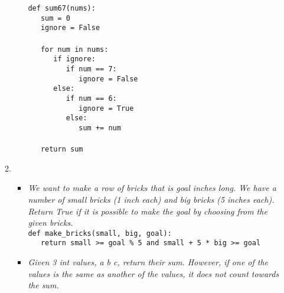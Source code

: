 \documentclass[9pt]{article}
\begin{document}
\begin{enumerate}
\begin{enumerate}
\begin{itemize}
                        \verb|def sum67(nums):| \\
                        \verb|   sum = 0| \\
                        \verb|   ignore = False| \\ \\
                        \verb|   for num in nums:| \\
                        \verb|      if ignore:| \\
                        \verb|         if num == 7:| \\
                        \verb|            ignore = False| \\
                        \verb|      else:| \\
                        \verb|         if num == 6:| \\
                        \verb|            ignore = True| \\
                        \verb|         else:| \\
                        \verb|            sum += num| \\ \\
                        \verb|   return sum| \\
               \end{itemize}
         \item \begin{itemize}
                  \item \textit{We want to make a row of bricks that is goal 
                        inches long. We have a number of small bricks (1 inch 
                        each) and big bricks (5 inches each). Return True if it 
                        is possible to make the goal by choosing from the given 
                        bricks.} \\         
   
                        \verb|def make_bricks(small, big, goal):| \\
                        \verb|   return small >= goal % 5 and small + 5 * big >= goal|\\
                  \item \textit{Given 3 int values, a b c, return their sum. 
                        However, if one of the values is the same as another of 
                        the values, it does not count towards the sum.} \\


\end{itemize}
\end{enumerate}
\end{enumerate}
\end{document}
